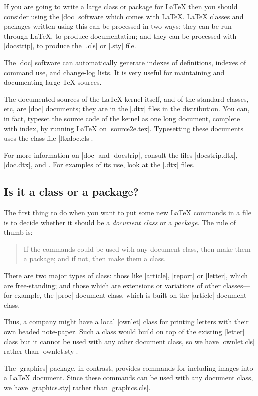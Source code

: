 \documentclass[11pt]{ltxguide}[1995/11/28]
\begin{document}
If you are going to write a large class or package for \LaTeX{} then
you should consider using the |doc| software which comes with
\LaTeX{}.
\LaTeX{} classes and packages written using this can be
processed in two ways: they can be run through \LaTeX{}, to produce
documentation; and they can be processed with |docstrip|, to produce
the |.cls| or |.sty| file.

The |doc| software can automatically generate indexes of definitions,
indexes of command use, and change-log lists.  It is very useful for
maintaining and documenting large \TeX{} sources.

The documented sources of the \LaTeX{} kernel itself, and of the
standard classes, etc, are |doc| documents; they are in the |.dtx|
files in the distribution.  You can, in fact, typeset the source code
of the kernel as one long document, complete with index, by running
\LaTeX{} on |source2e.tex|.  Typesetting these documents uses the
class file |ltxdoc.cls|.

For more information on |doc| and |docstrip|, consult the files
|docstrip.dtx|, |doc.dtx|, and \emph{\LaTeXcomp}.  For examples of its
use, look at the |.dtx| files.

\subsection{Is it a class or a package?}
\label{Sec:classorpkg}

The first thing to do when you want to put some new \LaTeX{} commands
in a file is to decide whether it should be a \emph{document class} or a
\emph{package}.  The rule of thumb is:
\begin{quote}
  If the commands could be used with any document class, then make
  them a package; and if not, then make them a class.
\end{quote}

There are two major types of class: those like |article|, |report| or
|letter|, which are free-standing; and those which are extensions or
variations of other classes---for example, the |proc| document class,
which is built on the |article| document class.

Thus, a company might have a local |ownlet| class for printing letters
with their own headed note-paper.  Such a class would build on top of
the existing |letter| class but it cannot be used with any other
document class, so we have |ownlet.cls| rather than |ownlet.sty|.

The |graphics| package, in contrast, provides commands for including
images into a \LaTeX{} document.  Since these commands can be used
with any document class, we have |graphics.sty| rather than
|graphics.cls|.
\end{document}
